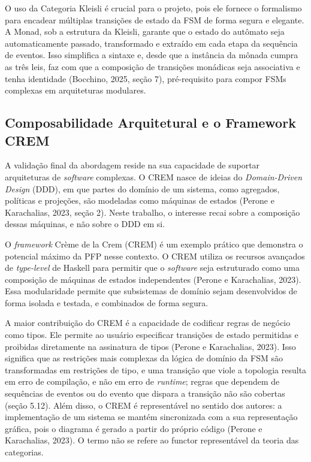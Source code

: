 \documentclass[12pt,a4paper]{article}
\begin{document}
O uso da Categoria Kleisli é crucial para o projeto, pois ele fornece o formalismo para encadear múltiplas transições de estado da FSM de forma segura e elegante. A Monad, sob a estrutura da Kleisli, garante que o estado do autômato seja automaticamente passado, transformado e extraído em cada etapa da sequência de eventos. Isso simplifica a sintaxe e, desde que a instância da mônada cumpra as três leis, faz com que a composição de transições monádicas seja associativa e tenha identidade (Bocchino, 2025, seção 7), pré-requisito para compor FSMs complexas em arquiteturas modulares.

\subsection{Composabilidade Arquitetural e o Framework CREM}

A validação final da abordagem reside na sua capacidade de suportar arquiteturas de \textit{software} complexas. O CREM nasce de ideias do \textit{Domain-Driven Design} (DDD), em que partes do domínio de um sistema, como agregados, políticas e projeções, são modeladas como máquinas de estados (Perone e Karachalias, 2023, seção 2). Neste trabalho, o interesse recai sobre a composição dessas máquinas, e não sobre o DDD em si.

O \textit{framework} Crème de la Crem (CREM) é um exemplo prático que demonstra o potencial máximo da PFP nesse contexto. O CREM utiliza os recursos avançados de \textit{type-level} de Haskell para permitir que o \textit{software} seja estruturado como uma composição de máquinas de estados independentes (Perone e Karachalias, 2023). Essa modularidade permite que subsistemas de domínio sejam desenvolvidos de forma isolada e testada, e combinados de forma segura.

A maior contribuição do CREM é a capacidade de codificar regras de negócio como tipos. Ele permite ao usuário especificar transições de estado permitidas e proibidas diretamente na assinatura de tipos (Perone e Karachalias, 2023). Isso significa que as restrições mais complexas da lógica de domínio da FSM são transformadas em restrições de tipo, e uma transição que viole a topologia resulta em erro de compilação, e não em erro de \textit{runtime}; regras que dependem de sequências de eventos ou do evento que dispara a transição não são cobertas (seção 5.12). Além disso, o CREM é representável no sentido dos autores: a implementação de um sistema se mantém sincronizada com a sua representação gráfica, pois o diagrama é gerado a partir do próprio código (Perone e Karachalias, 2023). O termo não se refere ao functor representável da teoria das categorias.
\end{document}
